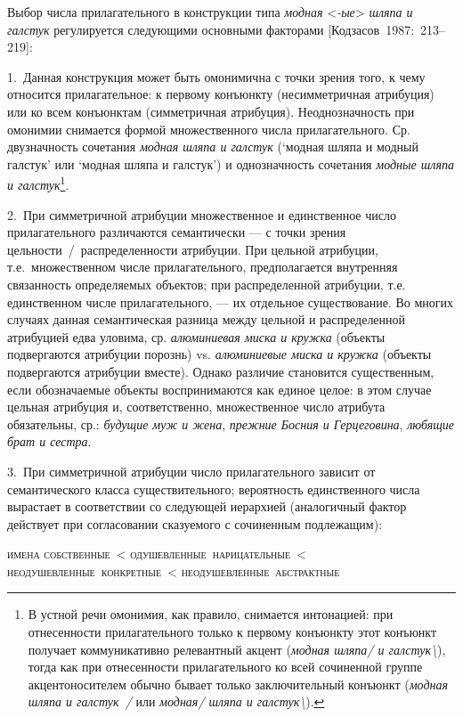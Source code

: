 Выбор числа прилагательного в конструкции типа \textit{модная}
\textless{}\textit{-ые}\textgreater{} \textit{шляпа и галстук} регулируется
следующими основными факторами {[}Кодзасов~1987:~213--219{]}:

1.~Данная конструкция может быть омонимична с точки зрения того, к чему
относится прилагательное: к первому конъюнкту (несимметричная атрибуция)
или ко всем конъюнктам (симметричная атрибуция). Неоднозначность при
омонимии снимается формой множественного числа прилагательного. Ср.
двузначность сочетания \textit{модная шляпа и галстук} (`модная шляпа и
модный галстук' или `модная шляпа и галстук') и однозначность сочетания
\textit{модные шляпа и галстук}\footnote{В устной речи омонимия, как
  правило, снимается интонацией: при отнесенности прилагательного только
  к первому конъюнкту этот конъюнкт получает коммуникативно релевантный
  акцент (\textit{модная шляпа/ и галстук\textbackslash{}}), тогда как при
  отнесенности прилагательного ко всей сочиненной группе
  акцентоносителем обычно бывает только заключительный конъюнкт
  (\textit{модная шляпа и галстук~/} или \textit{модная/ шляпа и
    галстук\textbackslash{}}).}.

2.~При симметричной атрибуции множественное и единственное число
прилагательного различаются семантически --- с точки зрения
цельности~/~распределенности атрибуции. При цельной атрибуции,
т.е.~множественном числе прилагательного, предполагается внутренняя
связанность определяемых объектов; при распределенной атрибуции, т.е.
единственном числе прилагательного, --- их отдельное существование. Во
многих случаях данная семантическая разница между цельной и
распределенной атрибуцией едва уловима, ср. \textit{алюминиевая миска и
  кружка} (объекты подвергаются атрибуции порознь) vs. \textit{алюминиевые
  миска и кружка} (объекты подвергаются атрибуции вместе). Однако различие
становится существенным, если обозначаемые объекты воспринимаются как
единое целое: в этом случае цельная атрибуция и, соответственно,
множественное число атрибута обязательны, ср.: \textit{будущие муж и
  жена}, \textit{прежние Босния и Герцеговина}, \textit{любящие брат и
  сестра}.

3.~При симметричной атрибуции число прилагательного зависит от
семантического класса существительного; вероятность единственного числа
вырастает в соответствии со следующей иерархией (аналогичный фактор
действует при согласовании сказуемого с сочиненным подлежащим):

\textsc{имена собственные~\textless{}
  одушевленные~нарицательные~\textless{}
  неодушевленные~конкретные~\textless{} неодушевленные~абстрактные}

